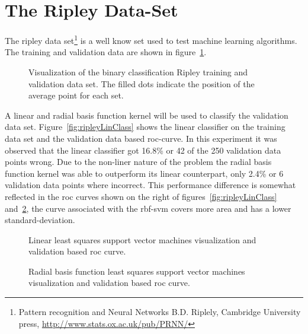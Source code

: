 \section{The Ripley Data-Set}
The ripley data set\footnote{Pattern recognition and Neural Networks B.D. Riplely, Cambridge University press, \url{http://www.stats.ox.ac.uk/pub/PRNN/}} is a well know set used to test machine learning algorithms. The training and validation data are shown in figure~\ref{fig:ripleyVisual}. 
\begin{figure}
\centering
\tikzset{mark size=1}


\caption{Visualization of the binary classification Ripley training and validation data set. The filled dots indicate the position of the average point for each set.}
\label{fig:ripleyVisual}
\end{figure}
A linear and radial basis function kernel will be used to classify the validation data set. Figure~\ref{fig:ripleyLinClass} shows the linear classifier on the training data set and the validation data based roc-curve. In this experiment it was observed that the linear classifier got 16.8\% or 42 of the 250 validation data points wrong. Due to the non-liner nature of the problem the radial basis function kernel was able to outperform its linear counterpart, only 2.4\% or 6 validation data points where incorrect. This performance difference is somewhat reflected in the roc curves shown on the right of figures~\ref{fig:ripleyLinClass} and~\ref{fig:ripleyClass}, the curve associated with the rbf-svm covers more area and has a lower standard-deviation. 

\begin{figure}
\centering
\tikzset{mark size=1}


\caption{Linear least squares support vector machines visualization and validation based roc curve.}
\label{fig:ripleyLinClass}


\caption{Radial basis function least squares support vector machines visualization and validation based roc curve.}
\label{fig:ripleyClass}
\end{figure}

